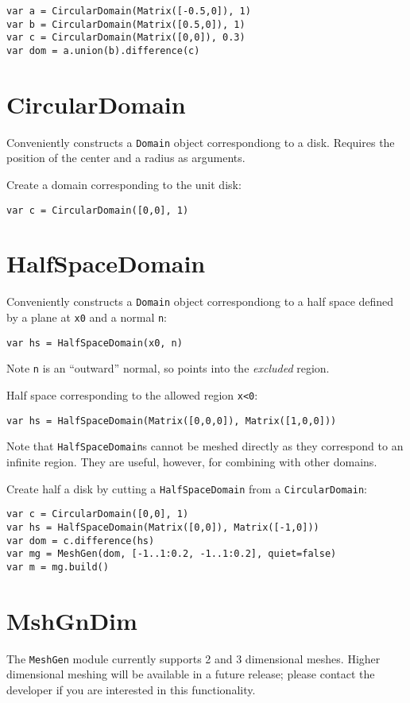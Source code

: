 \begin{lstlisting}
var a = CircularDomain(Matrix([-0.5,0]), 1)
var b = CircularDomain(Matrix([0.5,0]), 1)
var c = CircularDomain(Matrix([0,0]), 0.3)
var dom = a.union(b).difference(c)
\end{lstlisting}

\hypertarget{circulardomain}{%
\section{CircularDomain}\label{circulardomain}}

Conveniently constructs a \texttt{Domain} object correspondiong to a
disk. Requires the position of the center and a radius as arguments.

Create a domain corresponding to the unit disk:

\begin{lstlisting}
var c = CircularDomain([0,0], 1)
\end{lstlisting}

\hypertarget{halfspacedomain}{%
\section{HalfSpaceDomain}\label{halfspacedomain}}

Conveniently constructs a \texttt{Domain} object correspondiong to a
half space defined by a plane at \texttt{x0} and a normal \texttt{n}:

\begin{lstlisting}
var hs = HalfSpaceDomain(x0, n)
\end{lstlisting}

Note \texttt{n} is an ``outward'' normal, so points into the
\emph{excluded} region.

Half space corresponding to the allowed region \texttt{x\textless{}0}:

\begin{lstlisting}
var hs = HalfSpaceDomain(Matrix([0,0,0]), Matrix([1,0,0]))
\end{lstlisting}

Note that \texttt{HalfSpaceDomain}s cannot be meshed directly as they
correspond to an infinite region. They are useful, however, for
combining with other domains.

Create half a disk by cutting a \texttt{HalfSpaceDomain} from a
\texttt{CircularDomain}:

\begin{lstlisting}
var c = CircularDomain([0,0], 1)
var hs = HalfSpaceDomain(Matrix([0,0]), Matrix([-1,0]))
var dom = c.difference(hs) 
var mg = MeshGen(dom, [-1..1:0.2, -1..1:0.2], quiet=false)
var m = mg.build()
\end{lstlisting}

\hypertarget{mshgndim}{%
\section{MshGnDim}\label{mshgndim}}

The \texttt{MeshGen} module currently supports 2 and 3 dimensional
meshes. Higher dimensional meshing will be available in a future
release; please contact the developer if you are interested in this
functionality.
